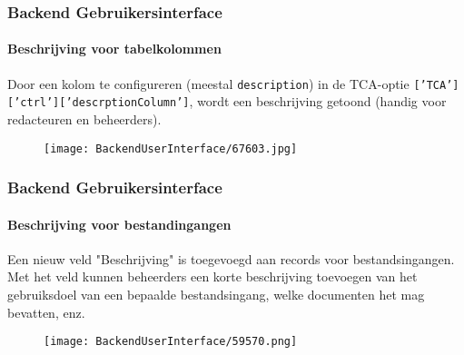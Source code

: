 \begin{frame}[fragile]
	\frametitle{Backend Gebruikersinterface}
	\framesubtitle{Beschrijving voor tabelkolommen}

	Door een kolom te configureren (meestal \texttt{description}) in de TCA-optie \texttt{['TCA']['ctrl']['descrptionColumn']},
	wordt een beschrijving getoond (handig voor redacteuren en beheerders).

	\begin{figure}
		\texttt{[image: BackendUserInterface/67603.jpg]}
	\end{figure}

\end{frame}

\begin{frame}[fragile]
	\frametitle{Backend Gebruikersinterface}
	\framesubtitle{Beschrijving voor bestandingangen}

	Een nieuw veld "Beschrijving" is toegevoegd aan records voor bestandsingangen.
	Met het veld kunnen beheerders een korte beschrijving toevoegen van het gebruiksdoel van een bepaalde
	bestandsingang, welke documenten het mag bevatten, enz.

	\begin{figure}
		\texttt{[image: BackendUserInterface/59570.png]}
	\end{figure}

\end{frame}

